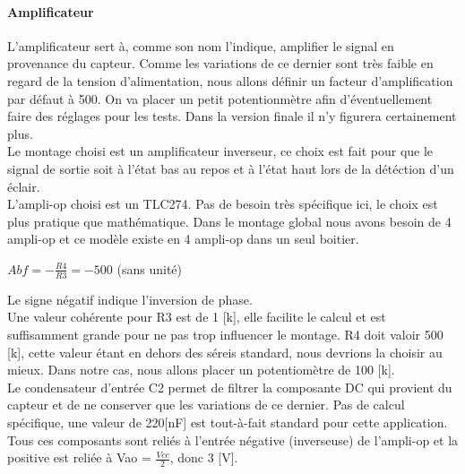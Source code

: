 \documentclass[a4paper,10pt]{article}
\begin{document}
\paragraph{Amplificateur}
L'amplificateur sert à, comme son nom l'indique, amplifier le signal en provenance du capteur. Comme les variations de ce dernier sont très faible en regard de la tension d'alimentation, nous allons définir un facteur d'amplification par défaut à 500. On va placer un petit potentionmètre afin d'éventuellement faire des réglages pour les tests. Dans la version finale il n'y figurera certainement plus. \\
Le montage choisi est un amplificateur inverseur, ce choix est fait pour que le signal de sortie soit à l'état bas au repos et à l'état haut lors de la détéction d'un éclair. \\
L'ampli-op choisi est un TLC274. Pas de besoin très spécifique ici, le choix est plus pratique que mathématique. Dans le montage global nous avons besoin de 4 ampli-op et ce modèle existe en 4 ampli-op dans un seul boitier.
\begin{center}
 $ Abf = -\frac{R4}{R3} = -500 $ (sans unité)
\end{center}
Le signe négatif indique l'inversion de phase. \\
Une valeur cohérente pour R3 est de 1 [k\ohm], elle facilite le calcul et est suffisamment grande pour ne pas trop influencer le montage. R4 doit valoir 500 [k\ohm], cette valeur étant en dehors des séreis standard, nous devrions la choisir au mieux. Dans notre cas, nous allons placer un potentiomètre de 100 [k\ohm]. \\
Le condensateur d'entrée C2 permet de filtrer la composante DC qui provient du capteur et de ne conserver que les variations de ce dernier. Pas de calcul spécifique, une valeur de 220[nF] est tout-à-fait standard pour cette application. \\
Tous ces composants sont reliés à l'entrée négative (inverseuse) de l'ampli-op et la positive est reliée à Vao = $ \frac{Vcc}{2} $, donc 3 [V].
\end{document}
